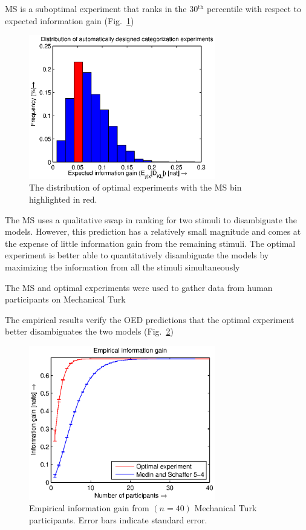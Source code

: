 \documentclass{article}
\begin{document}
MS is a suboptimal experiment that ranks in the 30$^\text{th}$ percentile with respect to expected information gain (Fig.~\ref{fig:dist})
\begin{figure}[h!]
\centering
\includegraphics[width=3.2in]{img/dist.eps}
\caption{The distribution of optimal experiments with the MS bin highlighted in red.}
\label{fig:dist}
\end{figure}

The MS uses a qualitative swap in ranking for two stimuli to disambiguate the models. However, this prediction has a relatively small magnitude and comes at the expense of little information gain from the remaining stimuli. The optimal experiment is better able to quantitatively disambiguate the models by maximizing the information from all the stimuli simultaneously

The MS and optimal experiments were used to gather data from human participants on Mechanical Turk

The empirical results verify the OED predictions that the optimal experiment better disambiguates the two models (Fig.~\ref{fig:empirical})
\begin{figure}[h!]
\centering
\includegraphics[width=3.2in]{img/empirical.eps}
\caption{Empirical information gain from $(n=40)$ Mechanical Turk participants. Error bars indicate standard error.}
\label{fig:empirical}
\end{figure}
\end{document}
